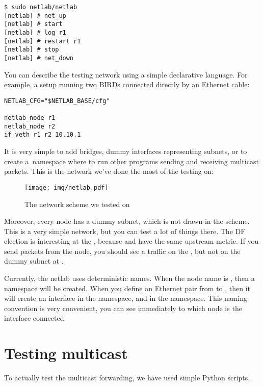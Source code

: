 \begin{lstlisting}
$ sudo netlab/netlab
[netlab] # net_up
[netlab] # start
[netlab] # log r1
[netlab] # restart r1
[netlab] # stop
[netlab] # net_down
\end{lstlisting}

\noindent You can describe the testing network using a simple declarative language. For
example, a setup running two BIRDs connected directly by an Ethernet cable:

\begin{lstlisting}
NETLAB_CFG="$NETLAB_BASE/cfg"

netlab_node r1
netlab_node r2
if_veth r1 r2 10.10.1
\end{lstlisting}

\noindent It is very simple to add bridges, dummy interfaces representing subnets, or to
create a~namespace where to run other programs sending and receiving multicast
packets. This is the network we've done the most of the testing on:

\begin{figure}[htp]
\centering
\texttt{[image: img/netlab.pdf]}
\caption{The network scheme we tested on}
\label{netlab}
\end{figure}

Moreover, every node has a dummy subnet, which is not drawn in the scheme.
This is a very simple network, but you can test a lot of things there. The DF
election is interesting at the , because  and 
have the same upstream metric. If you send packets from the  node, you should see
a traffic on the , but not on the dummy subnet at .

Currently, the netlab uses deterministic names. When the node name is
, then a namespace  will be created. When you define
an Ethernet pair from  to , then it will create an interface
 in the  namespace, and  in the
 namespace. This naming convention is very convenient, you can
see immediately to which node is the interface connected.

\section{Testing multicast}
To actually test the multicast forwarding, we have used simple Python scripts.

